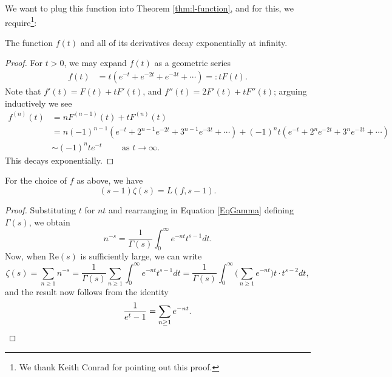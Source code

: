\documentclass[a4paper,10pt, english, reqno]{smfart}
\numberwithin{equation}{section}
\begin{document}
We want to plug this function into Theorem \ref{thm:l-function}, and for this, we require\footnote{We thank Keith Conrad for pointing out this proof.}:
\begin{lemma}
	The function $f(t)$ and all of its derivatives decay exponentially at infinity. 
\end{lemma}

\begin{proof}
	For $t >0$, we may expand $f(t)$ as a geometric series
	\begin{align*}
		f(t) &= t(e^{-t} + e^{-2t} + e^{-3t} + \cdots) =: t F(t).
	\end{align*}
	Note that $f'(t) = F(t) + tF'(t)$, and $f''(t) = 2F'(t) + tF''(t)$; arguing inductively we see
	\begin{align*}
		f^{(n)}(t) &= nF^{(n-1)}(t) + tF^{(n)}(t) \\
		&= n (-1)^{n-1} (e^{-t} + 2^{n-1} e^{-2t} + 3^{n-1} e^{-3t} + \cdots) + (-1)^{n}t(e^{-t} + 2^ne^{-2t} + 3^n e^{-3t} + \cdots)\\
		&\sim (-1)^nte^{-t} \qquad \text{ as }t \to \infty.
	\end{align*}
	This decays exponentially.
\end{proof}



\begin{lemma} \label{lem:FormulaZeta}
	For the choice of $f$ as above, we have
	\[(s-1)\zeta(s) = L(f,s-1).\]
\end{lemma}
\begin{proof}
Substituting $t$ for $nt$ and rearranging in Equation \eqref{EqGamma} defining $\Gamma(s)$, we obtain 
	\[n^{-s} = \frac{1}{\Gamma(s)}\int_0^\infty e^{-nt}t^{s-1}dt.\]
	Now, when $\mathrm{Re}(s)$ is sufficiently large, we can write
	\[ \zeta(s) = \sum_{n\geq 1} n^{-s} = \frac{1}{\Gamma(s)}\sum_{n\geq 1}\int_0^\infty e^{-nt}t^{s-1}dt = \frac{1}{\Gamma(s)}\int_0^\infty \bigg( \sum_{n\geq 1} e^{-nt} \bigg) t\cdot t^{s-2}dt, \]
	and the result now follows from the identity
	\[\frac{1}{e^t - 1} = \sum_{n \geq 1} e^{-nt}. \qedhere \]
\end{proof}
\end{document}
